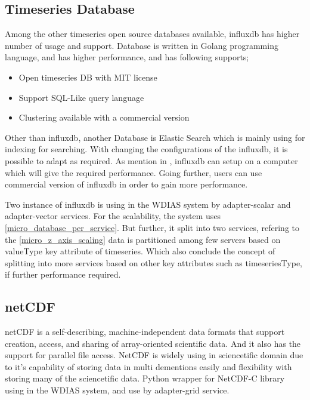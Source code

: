 \subsection{Timeseries Database}
\label{subse:influxdb}
Among the other timeseries open source databases available, \acrshort{influxdb} \cite{influxdbInfluxDBDocumentation} has higher number of usage and support. Database is written in Golang programming language, and has higher performance, and has following supports;
\begin{itemize}
  \item Open timeseries DB with MIT license
  \item Support SQL-Like query language
  \item Clustering available with a commercial version
\end{itemize}
Other than \acrshort{influxdb}, another Database is Elastic Search which is mainly using for indexing for searching.
With changing the configurations of the \acrshort{influxdb}, it is possible to adapt as required. As mention in \cite{influxdbInfluxDBDocumentation}, 
\acrshort{influxdb} can setup on a computer which will give the required performance. Going further, users can use commercial version of \acrshort{influxdb} in order to gain more performance.

Two instance of \acrshort{influxdb} is using in the WDIAS system by adapter-scalar and adapter-vector services. For the scalability, the system uses \ref{micro_database_per_service}.
But further, it split into two services, refering to the \ref{micro_z_axis_scaling} data is partitioned among few servers based on valueType key attribute of timeseries.
Which also conclude the concept of splitting into more services based on other key attributes such as timeseriesType, if further performance required.

\subsection{\acrfull{netCDF}} 
\label{subse:netcdf}
\acrshort{netCDF} \cite{unidataUnidataNetCDF} is a self-describing, machine-independent data formats that support creation, access, and sharing of array-oriented scientific data.
And it also has the support for parallel file access.
NetCDF is widely using in sciencetific domain due to it's capability of storing data in multi dementions easily and flexibility with storing many of the sciencetific data.
Python wrapper for NetCDF-C library using in the WDIAS system, and use by adapter-grid service.

